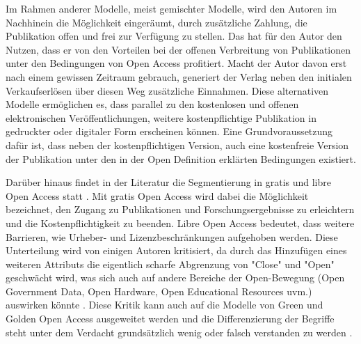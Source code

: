 Im Rahmen anderer Modelle, meist gemischter Modelle, wird den Autoren im Nachhinein die Möglichkeit eingeräumt, durch zusätzliche Zahlung, die Publikation offen und frei zur Verfügung zu stellen\cite{lewis_2012_inevitability}. Das hat für den Autor den Nutzen, dass er von den Vorteilen bei der offenen Verbreitung von Publikationen unter den Bedingungen von Open Access profitiert. Macht der Autor davon erst nach einem gewissen Zeitraum gebrauch, generiert der Verlag neben den initialen Verkaufserlösen über diesen Weg zusätzliche Einnahmen. Diese alternativen Modelle ermöglichen es, dass parallel zu den kostenlosen und offenen elektronischen Veröffentlichungen, weitere kostenpflichtige Publikation in gedruckter oder digitaler Form erscheinen können. Eine Grundvoraussetzung dafür ist, dass neben der kostenpflichtigen Version, auch eine kostenfreie Version der Publikation unter den in der Open Definition erklärten Bedingungen existiert.

Darüber hinaus findet in der Literatur die Segmentierung in gratis und libre Open Access statt \cite{Martin_2013} \cite{naeder_2010_open} \cite{Mounce_2015}. Mit gratis Open Access wird dabei die Möglichkeit bezeichnet, den Zugang zu Publikationen und Forschungsergebnisse zu erleichtern und die Kostenpflichtigkeit zu beenden. Libre Open Access bedeutet, dass weitere Barrieren, wie Urheber- und Lizenzbeschränkungen aufgehoben werden. \cite{Adema_2014_open_access} Diese Unterteilung wird von einigen Autoren kritisiert, da durch das Hinzufügen eines weiteren Attributs die eigentlich scharfe Abgrenzung von "Close" und "Open" geschwächt wird, was sich auch auf andere Bereiche der Open-Bewegung (Open Government Data, Open Hardware, Open Educational Resources‎ uvm.) auswirken könnte \cite{suchen}. Diese Kritik kann auch auf die Modelle von Green und Golden Open Access ausgeweitet werden und die Differenzierung der Begriffe steht unter dem Verdacht grundsätzlich wenig oder falsch verstanden zu werden \cite{Mounce_2015}.

